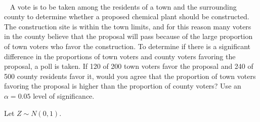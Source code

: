 \documentclass[letterpaper,10pt,addpoints]{exam}
\begin{document}
\begin{questions}


\question[10] ~

\question[10] ~
A vote is to be taken among the residents of a town and the surrounding county to determine whether a proposed chemical plant should be constructed. The construction site is within the town limits, and for this reason many voters in the county believe that the proposal will pass because of the large proportion of town voters who favor the construction. To determine if there is a significant difference in the proportions of town voters and county voters favoring the proposal, a poll is taken. If 120 of 200 town voters favor the proposal and 240 of 500 county residents favor it, would you agree that the proportion of town voters favoring the proposal is higher than the proportion of county voters? Use an $\alpha=0.05$ level of significance.

\question[10]
Let $Z\sim N(0, 1)$.



\end{questions}
\end{document}
